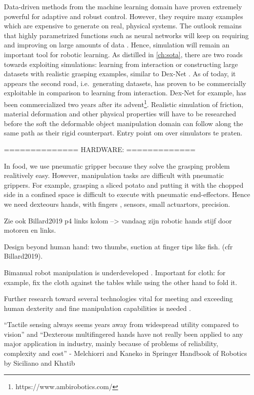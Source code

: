 \documentclass[\home/main.tex]{subfiles}
\begin{document}
Data-driven methods from the machine learning domain have proven extremely powerful for adaptive and robust control. However, they require many examples which are expensive to generate on real, physical systems. The outlook remains that highly parametrized functions such as neural networks will keep on requiring and improving on large amounts of data \autocite{sun2017revisiting}. Hence, simulation will remain an important tool for robotic learning. As distilled in \cref{ch:sota}, there are two roads towards exploiting simulations: learning from interaction or constructing large datasets with realistic grasping examples, similar to Dex-Net \autocite{dexnet}. As of today, it appears the second road, i.e.\ generating datasets, has proven to be commercially exploitable in comparison to learning from interaction. Dex-Net for example, has been commercialized two years after its advent\footnote{https://www.ambirobotics.com/}. Realistic simulation of friction, material deformation and other physical properties will have to be researched before the soft the deformable object manipulation domain can follow along the same path as their rigid counterpart. Entry point om over simulators te praten.

==============
HARDWARE:
=============

In food, we use pneumatic gripper because they solve the grasping problem realitively easy. However, manipulation tasks are difficult with pneumatic grippers. For example, grasping a sliced potato and putting it with the chopped side in a confined space is difficult to execute with pneumatic end-effectors. Hence we need dexteours hands, with fingers , sensors, small actuartors, precision. 

Zie ook Billard2019 p4 links kolom --> vandaag zijn robotic hands stijf door motoren en links. 

Design beyond human hand: two thumbs, suction at finger tips like fish. (cfr Billard2019). 

Bimanual robot manipulation is underdeveloped \autocite{Billard2019}. Important for cloth: for example, fix the cloth against the tables while using the other hand to fold it. 


Further research toward several technologies vital for meeting and exceeding human dexterity and fine manipulation capabilities is needed .


“Tactile sensing always seems years away from widespread utility compared to vision” 
and
“Dexterous multifingered hands have not really been applied to any major application in industry, mainly because of problems of reliability, complexity and cost” 
  - Melchiorri and Kaneko in Springer Handbook of Robotics by Siciliano and Khatib
\end{document}

